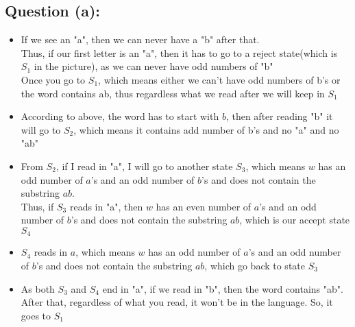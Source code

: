 \documentclass [9 pt]{article}
\theoremstyle{definition}
\begin{document}
\subsection*{Question (a):}
\begin{itemize}
	\item If we see an "a", then we can never have a "b" after that.\\
Thus, if our first letter is an "a", then it has to go to a reject state(which is $S_1$ in the picture), as we can never have odd numbers of "b"\\
Once you go to $S_1$, which means either we can't have odd numbers of b's or the word contains ab, thus regardless what we read after we will keep in $S_1$\\

	\item According to above, the word has to start with $b$, then after reading "b" it will go to $S_2$, which means it contains add number of b's and no "a" and no "ab"\\
	\item From $S_2$, if I read in "a", I will go to another state $S_3$, which means $w$ has an odd number of $a$’s and an odd number of $b$’s and does not contain the substring $ab$.\\
	Thus, if $S_3$ reads in "a", then $w$ has an even number of $a$’s and an odd number of $b$’s and does not contain the substring $ab$, which is our accept state $S_4$\\
	\item $S_4$ reads in $a$, which means $w$ has an odd number of $a$’s and an odd number of $b$’s and does not contain the substring $ab$, which go back to  state $S_3$\\
	\item As both $S_3$ and $S_4$ end in "a", if we read in "b", then the word contains "ab". After that, regardless of what you read, it won't be in the language. So, it goes to $S_1$
\end{itemize}
 
\end{document}
